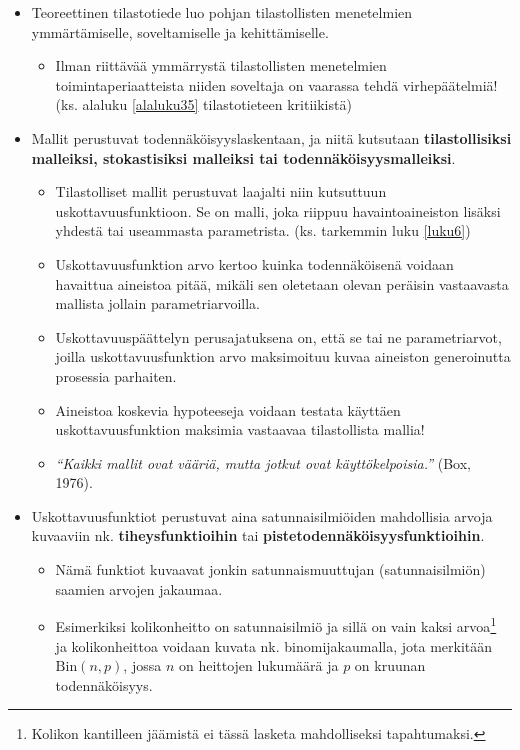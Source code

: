 \documentclass[
]{book}
\providecommand{\tightlist}{%
  \setlength{\itemsep}{0pt}\setlength{\parskip}{0pt}}
\begin{document}
\begin{itemize}
\tightlist
\item
  Teoreettinen tilastotiede luo pohjan tilastollisten menetelmien ymmärtämiselle, soveltamiselle ja kehittämiselle.

  \begin{itemize}
  \tightlist
  \item
    Ilman riittävää ymmärrystä tilastollisten menetelmien toimintaperiaatteista niiden soveltaja on vaarassa tehdä virhepäätelmiä! (ks. alaluku \ref{alaluku35} tilastotieteen kritiikistä)
  \end{itemize}
\item
  Mallit perustuvat todennäköisyyslaskentaan, ja niitä kutsutaan \textbf{tilastollisiksi malleiksi, stokastisiksi malleiksi tai todennäköisyysmalleiksi}.

  \begin{itemize}
  \tightlist
  \item
    Tilastolliset mallit perustuvat laajalti niin kutsuttuun uskottavuusfunktioon. Se on malli, joka riippuu havaintoaineiston lisäksi yhdestä tai useammasta parametrista. (ks. tarkemmin luku \ref{luku6})
  \item
    Uskottavuusfunktion arvo kertoo kuinka todennäköisenä voidaan havaittua aineistoa pitää, mikäli sen oletetaan olevan peräisin vastaavasta mallista jollain parametriarvoilla.
  \item
    Uskottavuuspäättelyn perusajatuksena on, että se tai ne parametriarvot, joilla uskottavuusfunktion arvo maksimoituu kuvaa aineiston generoinutta prosessia parhaiten.
  \item
    Aineistoa koskevia hypoteeseja voidaan testata käyttäen uskottavuusfunktion maksimia vastaavaa tilastollista mallia!
  \item
    \emph{``Kaikki mallit ovat vääriä, mutta jotkut ovat käyttökelpoisia.''} (Box, 1976).
  \end{itemize}
\end{itemize}

\hfill\break
\hfill\break

\begin{itemize}
\tightlist
\item
  Uskottavuusfunktiot perustuvat aina satunnaisilmiöiden mahdollisia arvoja kuvaaviin nk. \textbf{tiheysfunktioihin} tai \textbf{pistetodennäköisyysfunktioihin}.

  \begin{itemize}
  \tightlist
  \item
    Nämä funktiot kuvaavat jonkin satunnaismuuttujan (satunnaisilmiön) saamien arvojen jakaumaa.
  \item
    Esimerkiksi kolikonheitto on satunnaisilmiö ja sillä on vain kaksi arvoa\footnote{Kolikon kantilleen jäämistä ei tässä lasketa mahdolliseksi tapahtumaksi.} ja kolikonheittoa voidaan kuvata nk. binomijakaumalla, jota merkitään \(\text{Bin}(n,p)\), jossa \(n\) on heittojen lukumäärä ja \(p\) on kruunan todennäköisyys.
  \end{itemize}
\end{itemize}
\end{document}
